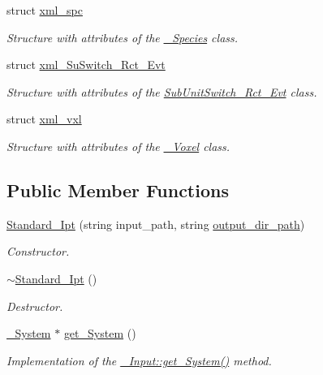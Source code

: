 \begin{DoxyCompactItemize}
struct \hyperlink{structnw_1_1_standard___ipt_1_1xml__spc}{xml\+\_\+spc}
\begin{DoxyCompactList}\small\item\em Structure with attributes of the \hyperlink{classnw_1_1___species}{\+\_\+\+Species} class. \end{DoxyCompactList}\item 
struct \hyperlink{structnw_1_1_standard___ipt_1_1xml___su_switch___rct___evt}{xml\+\_\+\+Su\+Switch\+\_\+\+Rct\+\_\+\+Evt}
\begin{DoxyCompactList}\small\item\em Structure with attributes of the \hyperlink{classnw_1_1_sub_unit_switch___rct___evt}{Sub\+Unit\+Switch\+\_\+\+Rct\+\_\+\+Evt} class. \end{DoxyCompactList}\item 
struct \hyperlink{structnw_1_1_standard___ipt_1_1xml__vxl}{xml\+\_\+vxl}
\begin{DoxyCompactList}\small\item\em Structure with attributes of the \hyperlink{classnw_1_1___voxel}{\+\_\+\+Voxel} class. \end{DoxyCompactList}\end{DoxyCompactItemize}
\subsection*{Public Member Functions}
\begin{DoxyCompactItemize}
\item 
\hyperlink{classnw_1_1_standard___ipt_a94434a8c2de8304a6ab626cdc11ea442}{Standard\+\_\+\+Ipt} (string input\+\_\+path, string \hyperlink{classnw_1_1_standard___ipt_a22ca09b593a0438676fd560f168e76f9}{output\+\_\+dir\+\_\+path})
\begin{DoxyCompactList}\small\item\em Constructor. \end{DoxyCompactList}\item 
\hyperlink{classnw_1_1_standard___ipt_a7d66e39904aa2462474703672b790caf}{$\sim$\+Standard\+\_\+\+Ipt} ()
\begin{DoxyCompactList}\small\item\em Destructor. \end{DoxyCompactList}\item 
\hyperlink{classnw_1_1___system}{\+\_\+\+System} $\ast$ \hyperlink{classnw_1_1_standard___ipt_ae5ae0e8b67291839d71df934bfc17238}{get\+\_\+\+System} ()
\begin{DoxyCompactList}\small\item\em Implementation of the \hyperlink{classnw_1_1___input_a5bb57fdb6dfcf4efa7b64e096594a8b3}{\+\_\+\+Input\+::get\+\_\+\+System()} method. \end{DoxyCompactList}\end{DoxyCompactItemize}
